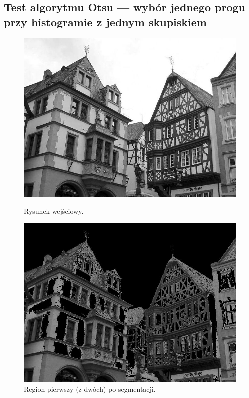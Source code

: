 \documentclass[10pt]{llncs}
\begin{document}
\clearpage
\subsection{Test algorytmu Otsu --- wybór jednego progu przy histogramie z jednym skupiskiem}

\begin{figure}[!htb]
  \includegraphics[width=\linewidth]{img/04.jpg}
  \caption{Rysunek wejściowy.}\label{fig:111}
\endminipage\hfill
{}
  \includegraphics[width=\linewidth]{img/04_region_01.jpg}
  \caption{Region pierwszy (z dwóch) po segmentacji.}\label{fig:211}
\endminipage\hfill
{}

\end{figure}
\end{document}

